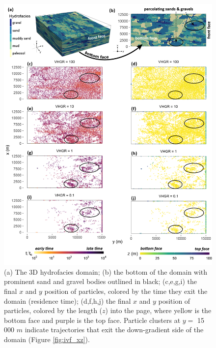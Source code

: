 \begin{figure}[H]
  \centering
  \includegraphics[width=14cm,keepaspectratio]{ch4_figs/krf_top_face_rtd_low_res-01.png}
  \caption{(a) The 3D hydrofacies domain; (b) the bottom of the domain with prominent sand and gravel bodies outlined in black; (c,e,g,i) the final $x$ and $y$ position of particles, colored by the time they exit the domain (residence time); (d,f,h,j) the final $x$ and $y$ position of particles, colored by the length ($z$) into the page, where yellow is the bottom face and purple is the top face. Particle clusters at $y =$ 15 000 $m$ indicate trajectories that exit the down-gradient side of the domain (Figure \ref{fig:ivf_xz}).}
  \label{fig:bottom_yx}
\end{figure}


